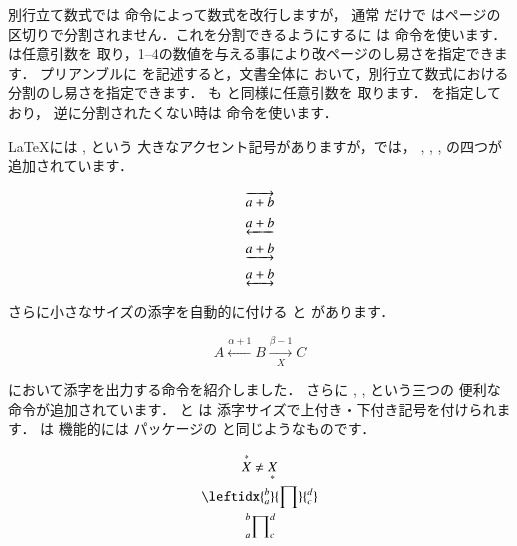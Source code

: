 \begin{Trick}
別行立て数式では \texttt{\bs\bs} 命令によって数式を改行しますが，
通常 \texttt{\bs\bs} だけで
はページの区切りで分割されません．これを分割できるようにするに
は  命令を使います． は任意引数を
取り，1--4の数値を与える事により改ページのし易さを指定できます．
プリアンブルに  を記述すると，文書全体に
おいて，別行立て数式における分割のし易さを指定できます．
 も と同様に任意引数を
取ります． を指定しており，
逆に分割されたくない時は \texttt{\bs\bs*} 命令を使います．
\end{Trick}

\begin{Exe}
\LaTeX には , という
大きなアクセント記号がありますが，では，
, 
, 
, 
の四つが追加されています．

\begin{InOut}
\begin{gather*}
 \overrightarrow{a + b}\\
 \underleftarrow{a + b}\\
 \underrightarrow{a + b}\\
 \underleftrightarrow{a + b}
\end{gather*}
\end{InOut}

さらに小さなサイズの添字を自動的に付ける  
と  があります．
\begin{Syntax}
 \quad
{}
\end{Syntax}

\begin{InOut}
\[ A \xleftarrow{\alpha + 1} B
 \xrightarrow[X]{\beta -1} C \]
\end{InOut}
\end{Exe}

\begin{Exe}
において添字を出力する命令を紹介しました．
さらに , ,  という三つの
便利な命令が追加されています． と  は
添字サイズで上付き・下付き記号を付けられます． は
機能的には パッケージの と同じようなものです．

\begin{InOut}
\begin{gather*}
\overset{*}{X} \neq \underset{*}{X}\\
\leftidx{_a^b}{\prod}{_c^d}\\
\sideset{_a^b}{_c^d}{\prod}
\end{gather*} 
\end{InOut}
\end{Exe}

